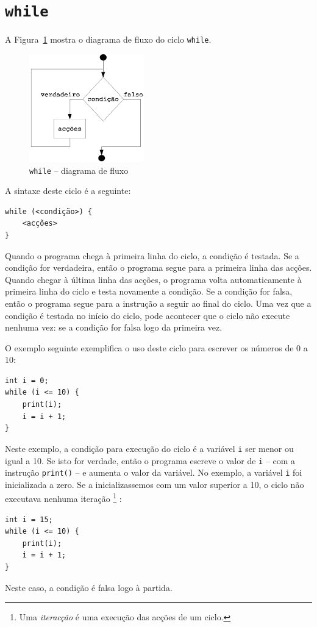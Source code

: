\section{\texttt{while}}
A Figura~\ref{fig:enquanto} mostra o diagrama de fluxo do ciclo \texttt{while}.
\begin{figure}[!h]
	\centering
		\includegraphics[width=5cm]{images/enquanto.eps}
	\caption{\texttt{while} -- diagrama de fluxo}
	\label{fig:enquanto}
\end{figure}

A sintaxe deste ciclo é a seguinte:
\begin{lstlisting}
while (<condição>) {
    <acções>
}
\end{lstlisting}

Quando o programa chega à primeira linha do ciclo, a condição é testada. Se a condição for verdadeira, então o programa segue para a primeira linha das acções. Quando chegar à última linha das acções, o programa volta automaticamente à primeira linha do ciclo e testa novamente a condição. Se a condição for falsa, então o programa segue para a instrução a seguir ao final do ciclo. Uma vez que a condição é testada no início do  ciclo, pode acontecer que o ciclo não execute nenhuma vez: se a condição for falsa logo da primeira vez.

O exemplo seguinte exemplifica o uso deste ciclo para escrever os números de 0 a 10:
\begin{lstlisting}
int i = 0;
while (i <= 10) {
    print(i);
    i = i + 1;
}
\end{lstlisting}
Neste exemplo, a condição para execução do ciclo é a variável \texttt{i} ser menor ou igual a 10. Se isto for verdade, então o programa escreve o valor de \texttt{i} -- com a instrução \texttt{print()} -- e aumenta o valor da variável. No exemplo, a variável \texttt{i} foi inicializada a zero. Se a inicializassemos com um valor superior a 10, o ciclo não executava nenhuma iteração%
\footnote{Uma \emph{iteracção} é uma execução das acções de um ciclo.}%
:
\begin{lstlisting}
int i = 15;
while (i <= 10) {
    print(i);
    i = i + 1;
}
\end{lstlisting}
Neste caso, a condição é falsa logo à partida.


